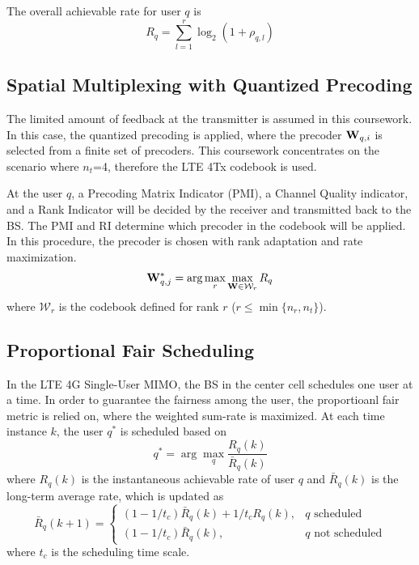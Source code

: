 \documentclass[10pt,conference]{IEEEtran}
\begin{document}
The overall achievable rate for user $q$ is
\begin{equation}
    R_q = \sum_{l=1}^{r} \log_2(1 + \rho_{q,l}) \label{eq12}
\end{equation}

\subsection{Spatial Multiplexing with Quantized Precoding}
The limited amount of feedback at the transmitter is assumed in this coursework.
In this case, the quantized precoding is applied, where the precoder
${\bf{W}}_{q,i}$ is selected from a finite set of precoders. This coursework
concentrates on the scenario where $n_t$=4, therefore the LTE 4Tx codebook is used.

At the user $q$, a Precoding Matrix Indicator (PMI), a Channel Quality indicator,
and a Rank Indicator will be decided by the receiver and transmitted back to 
the BS. The PMI and RI determine which precoder in the codebook will be applied.
In this procedure, the precoder is chosen with rank adaptation and rate maximization.
\begin{equation}
    {\bf{W}}_{q,j}^* = \arg \max_{r} \max_{{\bf{W}} \in \mathcal{W}_r} R_q \label{eq13}
\end{equation}
where $\mathcal{W}_r$ is the codebook defined for rank $r$ ($r \leq \min\{n_r,n_t\}$).

\subsection{Proportional Fair Scheduling}
In the LTE 4G Single-User MIMO, the BS in the center cell schedules one user 
at a time. In order to guarantee the fairness among the user, the proportioanl
fair metric is relied on, where the weighted sum-rate is maximized. At each time
instance $k$, the user $q^*$ is scheduled based on
\begin{equation}
    q^* = \arg\max_q \frac{R_q(k)}{\bar{R}_q(k)} \label{eq14}
\end{equation}
where $R_q(k)$ is the instantaneous achievable rate of user $q$ and $\bar{R}_q(k)$
is the long-term average rate, which is updated as
\begin{equation}
    \bar{R}_q(k+1)=\begin{cases} (1-1/t_c)\bar{R}_q(k) + 1/t_c R_q(k),& q \text{ scheduled}\\(1-1/t_c)\bar{R}_q(k),& q\text{ not scheduled} \end{cases} \label{eq15}
\end{equation}
where $t_c$ is the scheduling time scale. 
\end{document}
